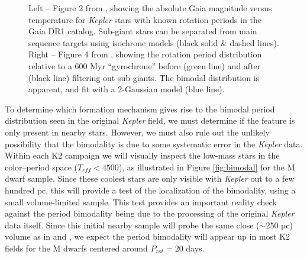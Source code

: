 \documentclass[12pt]{article}
\newcommand{\Kepler}{\textsl{Kepler}\xspace}
\begin{document}
\begin{figure}[!th]
\centering
{}
\caption{Left -- Figure 2 from \citet{davenport2017}, showing the absolute Gaia magnitude versus temperature for \Kepler stars with known rotation periods in the Gaia DR1 catalog. Sub-giant stars can be separated from main sequence targets using isochrone models (black solid \& dashed lines). Right -- Figure 4 from \citet{davenport2017}, showing the rotation period distribution relative to a 600 Myr ``gyrochrone'' before (green line) and after (black line) filtering out sub-giants. The bimodal distribution is apparent, and fit with a 2-Gaussian model (blue line).}
\label{fig:cmd}
\end{figure}

To determine which formation mechanism gives rise to the bimodal period distribution seen in the original \Kepler field, we must determine if the feature is only present in nearby stars. However, we must also rule out the unlikely possibility that the bimodality is due to some systematic error in the \Kepler data. Within each K2 campaign we will visually inspect the low-mass stars in the color--period space ($T_{eff}<4500$), as illustrated in Figure \ref{fig:bimodal} for the \citet{mcquillan2013} M dwarf sample. Since these coolest stars are only visible with \Kepler out to a few hundred pc, this will provide a test of the localization of the bimodality, using a small volume-limited sample. This test provides an important reality check against the period bimodality being due to the processing of the original \Kepler data itself. Since this initial nearby sample will probe the same close ($\sim$250 pc) volume as in \citet{mcquillan2013} and \citet{davenport2017}, we expect the period bimodality will appear up in most K2 fields for the M dwarfs centered around $P_{rot}=20$ days.
\end{document}
